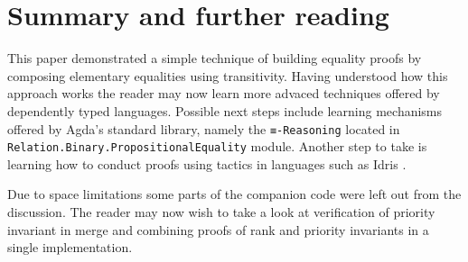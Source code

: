 \section{Summary and further reading}

This paper demonstrated a simple technique of building equality proofs by composing elementary equalities using transitivity. Having understood how this approach works the reader may now learn more advaced techniques offered by dependently typed languages. Possible next steps include learning mechanisms offered by Agda's standard library, namely the \texttt{≡-Reasoning} located in \texttt{Relation.}\texttt{Binary.}\texttt{PropositionalEquality} module. Another step to take is learning how to conduct proofs using tactics in languages such as Idris \cite{Bra13}.

Due to space limitations some parts of the companion code were left out from the discussion. The reader may now wish to take a look at verification of priority invariant in merge and combining proofs of rank and priority invariants in a single implementation.
